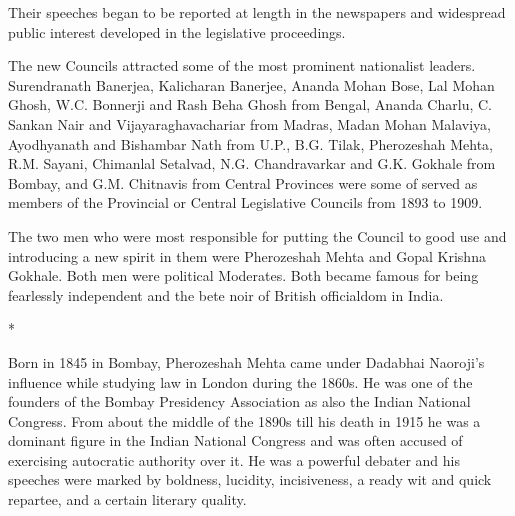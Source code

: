 Their speeches began to be reported at length in the newspapers and widespread public interest developed in the legislative proceedings.

The new Councils attracted some of the most prominent nationalist leaders. Surendranath Banerjea, Kalicharan Banerjee, Ananda Mohan Bose, Lal Mohan Ghosh, W.C. Bonnerji and Rash Beha Ghosh from Bengal, Ananda Charlu, C. Sankan Nair and Vijayaraghavachariar from Madras, Madan Mohan Malaviya, Ayodhyanath and Bishambar Nath from U.P., B.G. Tilak, Pherozeshah Mehta, R.M. Sayani, Chimanlal Setalvad, N.G. Chandravarkar and G.K. Gokhale from Bombay, and G.M. Chitnavis from Central Provinces were some of served as members of the Provincial or Central Legislative Councils from 1893 to 1909.

The two men who were most responsible for putting the Council to good use and introducing a new spirit in them were Pherozeshah Mehta and Gopal Krishna Gokhale. Both men were political Moderates. Both became famous for being fearlessly independent and the bete noir of British officialdom in India.

\begin{center}*\end{center}



Born in 1845 in Bombay, Pherozeshah Mehta came under Dadabhai Naoroji’s influence while studying law in London during the 1860s. He was one of the founders of the Bombay Presidency Association as also the Indian National Congress. From about the middle of the 1890s till his death in 1915 he was a dominant figure in the Indian National Congress and was often accused of exercising autocratic authority over it. He was a powerful debater and his speeches were marked by boldness, lucidity, incisiveness, a ready wit and quick repartee, and a certain literary quality.

